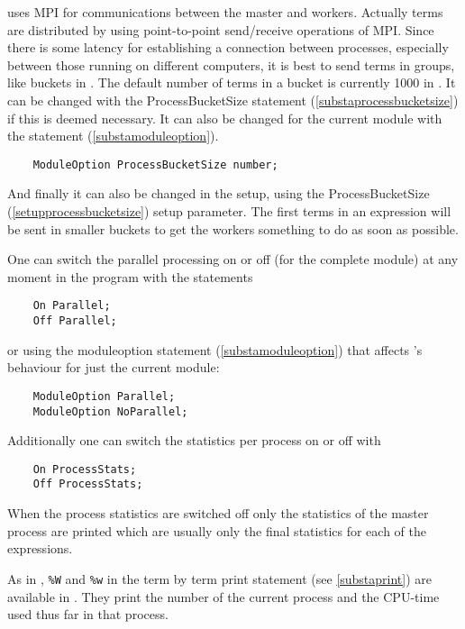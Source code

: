 \ParFORM{} uses MPI for communications between the master and workers. 
Actually terms are distributed by using point-to-point send/receive 
operations of MPI\@. Since there is some latency for establishing a 
connection between processes, especially between those running on different 
computers, it is best to send terms in groups, like buckets in \TFORM{}. 
The default number of terms in a bucket is currently 1000 in \ParFORM{}. It 
can be changed with the ProcessBucketSize statement 
(\ref{substaprocessbucketsize}) if this is deemed 
necessary. It can also be changed for the current module with the statement 
(\ref{substamoduleoption}).
\begin{verbatim}
    ModuleOption ProcessBucketSize number;
\end{verbatim}
And finally it can also be changed in the setup, using the 
ProcessBucketSize (\ref{setupprocessbucketsize}) setup parameter.
The first terms in an expression will be sent in smaller buckets to get the 
workers something to do as soon as possible.

One can switch the parallel processing on or off (for the complete module) 
at any moment in the program with the statements%
\begin{verbatim}
    On Parallel;
    Off Parallel;
\end{verbatim}
or using the moduleoption statement (\ref{substamoduleoption}) that
affects \ParFORM{}'s behaviour for just the current module:
\begin{verbatim}
    ModuleOption Parallel;
    ModuleOption NoParallel;
\end{verbatim}
Additionally one can switch the statistics per process on or off with
\begin{verbatim}
    On ProcessStats;
    Off ProcessStats;
\end{verbatim}
When the process statistics 
are switched off only the statistics of the master process are printed 
which are usually only the final statistics for each of the expressions.

As in \TFORM{}, \verb:%W: and \verb:%w: in the term by term 
print statement (see \ref{substaprint}) are available in 
\ParFORM{}. They print the number of the current process and the 
CPU-time used thus far in that process.

